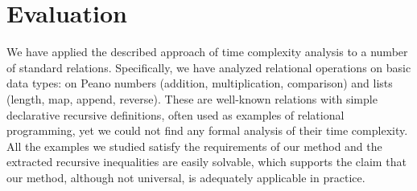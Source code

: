 \section{Evaluation}
\label{sec:evaluation}

We have applied the described approach of time complexity analysis to a number of standard \mK relations. Specifically, we have analyzed relational operations on basic data types: on Peano
numbers (addition, multiplication, comparison) and lists (length, map, append, reverse). These are well-known relations with simple declarative recursive definitions, often used as examples
of relational programming, yet we could not find any formal analysis of their time complexity. All the examples we studied satisfy the requirements of our method and the extracted recursive
inequalities are easily solvable, which supports the claim that our method, although not universal, is adequately applicable in practice.

